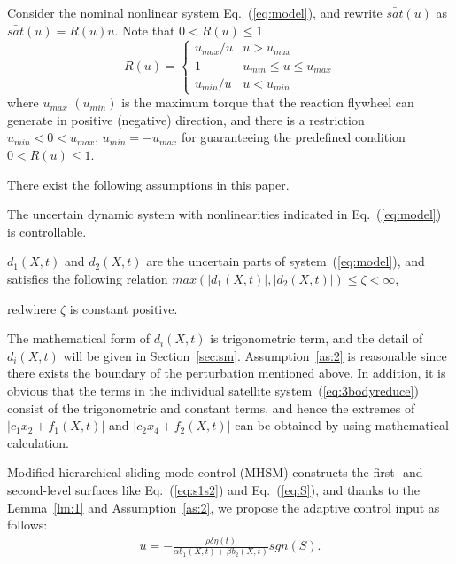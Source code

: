 Consider the nominal nonlinear system Eq.~(\ref{eq:model}), and rewrite $\bar{sat}(u)$ as $\bar{sat}(u) = R(u)u$. Note that $0 < R(u) \le 1$
\begin{equation}
R(u) =\begin{cases}
u_{max}/u   & u > u_{max}\\
1           & u_{min} \le u \le u_{max}\\
u_{min}/u   & u < u_{min}
\end{cases}
\end{equation}
where $u_{max}$ $(u_{min})$ is the maximum torque that the reaction flywheel can generate in positive (negative) direction, and there is a restriction $u_{min}<0<u_{max}$, $u_{min}=-u_{max}$ for guaranteeing the predefined condition $0<R(u)\le 1$.\par
There exist the following assumptions in this paper.
\begin{assumption}
The uncertain dynamic system with nonlinearities indicated in Eq.~(\ref{eq:model}) is controllable.\label{as:1}
\end{assumption}
\begin{assumption}
$d_1(X,t)$ and $d_2(X,t)$ are the uncertain parts of system~(\ref{eq:model}), and satisfies the following relation $max(\vert d_1(X,t)\vert,\vert d_2(X,t)\vert) \le \zeta <\infty$, \begin{color}{red}where $\zeta$ is constant positive.\end{color}\label{as:2}
\end{assumption}
\begin{remark}
The mathematical form of $d_i(X,t)$ is trigonometric term, and the detail of $d_i(X,t)$ will be given in Section~\ref{sec:sm}. Assumption~\ref{as:2} is reasonable since there exists the boundary of the perturbation mentioned above. In addition, it is obvious that the terms in the individual satellite system~(\ref{eq:3bodyreduce}) consist of the trigonometric and constant terms, and hence the extremes of $\vert c_1x_2+f_1(X,t)\vert$ and $\vert c_2x_4+f_2(X,t)\vert$ can be obtained by using mathematical calculation.
\end{remark}\par
Modified hierarchical sliding mode control (MHSM) constructs the first- and second-level surfaces like Eq.~(\ref{eq:s1s2}) and Eq.~(\ref{eq:S}), and thanks to the Lemma~\ref{lm:1} and Assumption~\ref{as:2}, we propose the adaptive control input as follows:
\begin{align}
u = -\frac{\rho\delta\eta(t)}{\alpha b_1(X,t)+\beta b_2(X,t)}sgn(S)\label{eq:u}.
\end{align}\par
